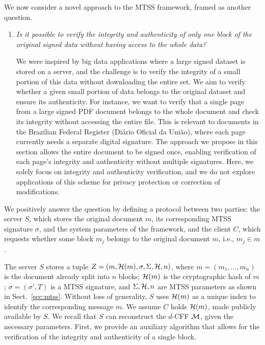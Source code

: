 \documentclass[12pt]{article}
\begin{document}
We now consider a novel approach to the MTSS framework, framed as another question.

\begin{enumerate}[label=$\mathbf{Q_{\arabic*}}$, itemsep=.5em, wide, labelindent=0pt, listparindent=0pt, resume]
  \item\label{question:partial-ver} \emph{Is it possible to verify the integrity and authenticity of only one block of the original signed data without having access to the whole data?}

  \vspace{.5em}

  We were inspired by big data applications where a large signed dataset is stored on a server, and the challenge is to verify the integrity of a small portion of this data without downloading the entire set. We aim to verify whether a given small portion of data belongs to the original dataset and ensure its authenticity. For instance, we want to verify that a single page from a large signed PDF document belongs to the whole document and check its integrity without accessing the entire file. This is relevant to documents in the Brazilian Federal Register (Diário Oficial da União), where each page currently needs a separate digital signature. The approach we propose in this section allows the entire document to be signed once, enabling verification of each page's integrity and authenticity without multiple signatures. Here, we solely focus on integrity and authenticity verification, and we do not explore applications of this scheme for privacy protection or correction of modifications.
\end{enumerate}

We positively answer the question by defining a protocol between two parties: the server $S$, which stores the original document $m$, its corresponding MTSS signature $\sigma$, and the system parameters of the framework, and the client $C$, which requests whether some block $m_j$ belongs to the original document $m$, i.e., $m_j \in m$.
  
The server $S$ stores a tuple $Z = (m, \mathcal{H}(m), \sigma, \Sigma, \mathcal{H}, n)$, where $m = (m_1, \dots, m_n)$ is the document already split into $n$ blocks; $\mathcal{H}(m)$ is the cryptographic hash of $m$; $\sigma = (\sigma', T)$ is a MTSS signature, and $\Sigma, \mathcal{H}, n$ are MTSS parameters as shown in Sect.~\ref{sec:mtss}. Without loss of generality, $S$ uses $\mathcal{H}(m)$ as a unique index to identify the corresponding message $m$. We assume $C$ holds $\mathcal{H}(m)$, made publicly available by $S$. We recall that $S$ can reconstruct the $d$-CFF $\mathcal{M}$, given the necessary parameters. First, we provide an auxiliary algorithm that allows for the verification of the integrity and authenticity of a single block.
\end{document}
